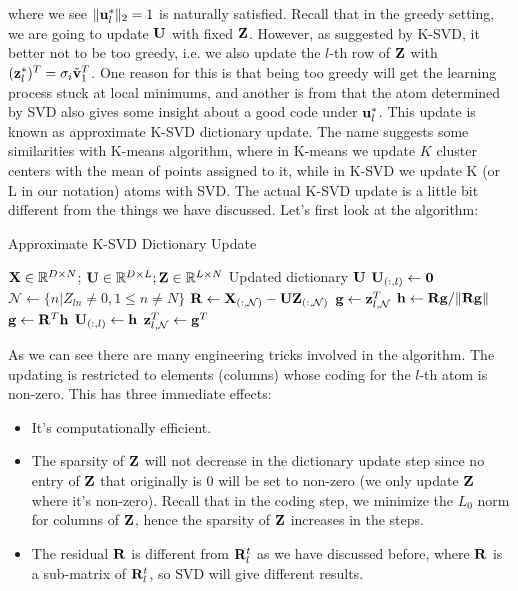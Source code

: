 \documentclass[../main.tex]{subfiles}
\begin{document}
where we see $\|{\bf u}_l^*\|_2=1$ is naturally satisfied. Recall that in the greedy setting, we are going to update ${\bf U}$ with fixed ${\bf Z}$. However, as suggested by K-SVD, it better not to be too greedy, i.e. we also update the $l$-th row of ${\bf Z}$ with $({\bf z}_l^{*})^T = \sigma_i\tilde{\bf v}_1^T$. One reason for this is that being too greedy will get the learning process stuck at local minimums, and another is from that the atom determined by SVD also gives some insight about a good code under ${\bf u}_l^*$. This update is known as approximate K-SVD dictionary update. The name suggests some similarities with K-means algorithm, where in K-means we update $K$ cluster centers with the mean of points assigned to it, while in K-SVD we update K (or L in our notation) atoms with SVD. The actual K-SVD update is a little bit different from the things we have discussed. Let's first look at the algorithm:
\begin{algorithm}
	\caption{Approximate K-SVD Dictionary Update}
	\begin{algorithmic}[1]
		\Require ${\bf X}\in \mathbb{R}^{D\times N}$; ${\bf U}\in \mathbb{R}^{D\times L}; {\bf Z}\in \mathbb{R}^{L\times N}$
		\Ensure Updated dictionary ${\bf U}$
		\State ${\bf U}_{(:,l)}\leftarrow {\bf 0}$ 
		\State $\mathcal{N}\leftarrow\{n|Z_{ln}\neq0,1\leq n\neq N\}$ 
		\State ${\bf R}\leftarrow{\bf X}_{(:,\mathcal{N})}-{\bf UZ}_{(:,\mathcal{N})}$	
		\State ${\bf g}\leftarrow {\bf z}^T_{l,\mathcal{N}}$
		\State ${\bf h}\leftarrow {\bf Rg}/\|{\bf Rg}\|$ 
		\State ${\bf g}\leftarrow {\bf R}^T{\bf h}$	
		\State ${\bf U}_{(:,l)}\leftarrow {\bf h}$ 
		\State ${\bf z}^T_{l,\mathcal{N}}\leftarrow {\bf g}^T$ 
		\EndFor
	\end{algorithmic}
\end{algorithm}
\par As we can see there are many engineering tricks involved in the algorithm. The updating is restricted to elements (columns) whose coding for the $l$-th atom is non-zero. This has three immediate effects: 
\begin{itemize}
	\item It's computationally efficient.
	\item The sparsity of ${\bf Z}$ will not decrease in the dictionary update step since no entry of ${\bf Z}$ that originally is $0$ will be set to non-zero (we only update ${\bf Z}$ where it's non-zero). Recall that in the coding step, we minimize the $L_0$ norm for columns of ${\bf Z}$, hence the sparsity of ${\bf Z}$ increases in the steps.
	\item The residual ${\bf R}$ is different from ${\bf R}_l^t$ as we have discussed before, where ${\bf R}$ is a sub-matrix of ${\bf R}_l^t$, so SVD will give different results.
\end{itemize} 
\end{document}
